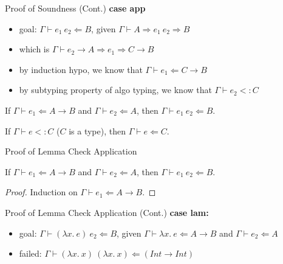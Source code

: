 \documentclass[compress,12pt,aspectratio=169]{beamer}
\begin{document}
\begin{frame}{Proof of Soundness (Cont.)}
\textbf{case app}
\begin{itemize}
    \item goal: $\Gamma \vdash e_1~e_2 \Leftarrow B$, given $\Gamma \vdash A \Rightarrow e_1~e_2 \Rightarrow B$
    \item which is $\Gamma \vdash \boxed{e_2} \rightarrow A \Rightarrow e_1 \Rightarrow C \rightarrow B$
    \item by induction hypo, we know that $\Gamma \vdash e_1 \Leftarrow C \rightarrow B$
    \item by subtyping property of algo typing, we know that $\Gamma \vdash \boxed{e_2} <: C$
\end{itemize}
\noindent\makebox[\linewidth]{\rule{\paperwidth}{0.4pt}}
\begin{lemma}
If $\Gamma \vdash e_1 \Leftarrow A \rightarrow B$ and $\Gamma \vdash e_2 \Leftarrow A$, then $\Gamma \vdash e_1~e_2 \Leftarrow B$.
\end{lemma}
\begin{lemma}
If 	$\Gamma \vdash \boxed{e} <: C$ ($C$ is a type), then $\Gamma \vdash e \Leftarrow C$.
\end{lemma}
\end{frame}

\begin{frame}{Proof of Lemma Check Application}
\begin{lemma}
If $\Gamma \vdash e_1 \Leftarrow A \rightarrow B$ and $\Gamma \vdash e_2 \Leftarrow A$, then $\Gamma \vdash e_1~e_2 \Leftarrow B$.
\end{lemma}
\begin{proof}
Induction on $\Gamma \vdash e_1 \Leftarrow A \rightarrow B$.
\end{proof}
\end{frame}

\begin{frame}{Proof of Lemma Check Application (Cont.)}
\textbf{case lam:}
\begin{itemize}
	\item goal: $\Gamma \vdash (\lambda x.~e)~e_2 \Leftarrow B$, given $\Gamma \vdash \lambda x. ~e \Leftarrow A \rightarrow B$ and $\Gamma \vdash e_2 \Leftarrow A$
	\item \textcolor{oc-red-8}{failed:} $\Gamma \vdash (\lambda x.~x)~(\lambda x.~x) \Leftarrow (Int \rightarrow Int)$
\end{itemize}
\end{frame}
\end{document}
